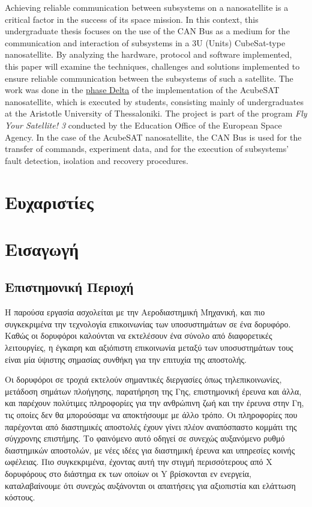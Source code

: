 \documentclass[a4paper,nobib,justified]{tufte-book}
\makeatletter
\renewcommand\mainmatter{%
	\if@openright%
	\cleardoublepage%
	\else%
	\clearpage%
	\fi%
	\@mainmattertrue%
	\fancyhf{}%
	\ifthenelse{\boolean{@tufte@twoside}}%
	{%
		\renewcommand{\chaptermark}[1]{\markboth{##1}{}}%
		\fancyhead[LE]{\thepage\quad\smallcaps{\newlinetospace{\removeaccent{\plaintitle}}}}%
		\fancyhead[RO]{\smallcaps{\newlinetospace{\removeaccent{\leftmark}}}\quad\thepage}%
	}%
	{%
		\fancyhead[RE,RO]{\smallcaps{\newlinetospace{\removeaccent{\plaintitle}}}\quad\thepage}%
	}%
}
\makeatother
\begin{document}
\begin{fullwidth}
	\centering
	\begin{minipage}{107mm}
		\justify
		Achieving reliable communication between subsystems on a nanosatellite is a critical factor in the success of its space mission. In this context, this undergraduate thesis focuses on the use of the CAN Bus as a medium for the communication and interaction of subsystems in a 3U (Units) CubeSat-type nanosatellite. By analyzing the hardware, protocol and software implemented, this paper will examine the techniques, challenges and solutions implemented to ensure reliable communication between the subsystems of such a satellite. The work was done in the \href{https://www.esa.int/Education/CubeSats_-_Fly_Your_Satellite/FYS_-_Programme_phases}{phase Delta} of the implementation of the AcubeSAT nanosatellite, which is executed by students, consisting mainly of undergraduates at the Aristotle University of Thessaloniki. The project is part of the program \emph{Fly Your Satellite! 3} conducted by the Education Office of the European Space Agency. In the case of the AcubeSAT nanosatellite, the CAN Bus is used for the transfer of commands, experiment data, and for the execution of subsystems' fault detection, isolation and recovery procedures.
	\end{minipage}
\end{fullwidth}
\chapter*{Ευχαριστίες}

\g{%
}

\mainmatter

\chapter{Εισαγωγή}
\section{Επιστημονική Περιοχή}
Η παρούσα εργασία ασχολείται με την Αεροδιαστημική Μηχανική, και πιο συγκεκριμένα την τεχνολογία επικοινωνίας των υποσυστημάτων σε ένα δορυφόρο. Καθώς οι δορυφόροι καλούνται να εκτελέσουν ένα σύνολο από διαφορετικές λειτουργίες, η έγκαιρη και αξιόπιστη επικοινωνία μεταξύ των υποσυστημάτων τους είναι μία ύψιστης σημασίας συνθήκη για την επιτυχία της αποστολής.

Οι δορυφόροι σε τροχιά εκτελούν σημαντικές διεργασίες όπως τηλεπικοινωνίες, μετάδοση σημάτων πλοήγησης, παρατήρηση της Γης, επιστημονική έρευνα και άλλα, και παρέχουν πολύτιμες πληροφορίες για την ανθρώπινη ζωή και την έρευνα στην Γη, τις οποίες δεν θα μπορούσαμε να αποκτήσουμε με άλλο τρόπο. Οι πληροφορίες που παρέχονται από διαστημικές αποστολές έχουν γίνει πλέον αναπόσπαστο κομμάτι της σύγχρονης επιστήμης. Το φαινόμενο αυτό οδηγεί σε συνεχώς αυξανόμενο ρυθμό διαστημικών αποστολών, με νέες ιδέες για διαστημική έρευνα και υπηρεσίες κοινής ωφέλειας. Πιο συγκεκριμένα, έχοντας αυτή την στιγμή περισσότερους από X δορυφόρους στο διάστημα εκ των οποίων οι Y βρίσκονται εν ενεργεία, καταλαβαίνουμε ότι συνεχώς αυξάνονται οι απαιτήσεις για αξιοπιστία και ελάττωση κόστους. %
\end{document}

